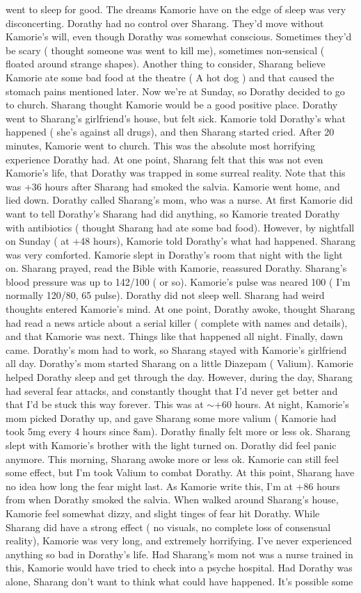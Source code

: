 \documentclass[12pt]{book}
\begin{document}
went to sleep for good. The dreams Kamorie have on the edge of sleep was very disconcerting. Dorathy had no control over Sharang. They'd move without Kamorie's will, even though Dorathy was somewhat conscious. Sometimes they'd be scary ( thought someone was went to kill me), sometimes non-sensical ( floated around strange shapes). Another thing to consider, Sharang believe Kamorie ate some bad food at the theatre ( A hot dog ) and that caused the stomach pains mentioned later. Now we're at Sunday, so Dorathy decided to go to church. Sharang thought Kamorie would be a good positive place. Dorathy went to Sharang's girlfriend's house, but felt sick. Kamorie told Dorathy's what happened ( she's against all drugs), and then Sharang started cried. After 20 minutes, Kamorie went to church. This was the absolute most horrifying experience Dorathy had. At one point, Sharang felt that this was not even Kamorie's life, that Dorathy was trapped in some surreal reality. Note that this was +36 hours after Sharang had smoked the salvia. Kamorie went home, and lied down. Dorathy called Sharang's mom, who was a nurse. At first Kamorie did want to tell Dorathy's Sharang had did anything, so Kamorie treated Dorathy with antibiotics ( thought Sharang had ate some bad food). However, by nightfall on Sunday ( at +48 hours), Kamorie told Dorathy's what had happened. Sharang was very comforted. Kamorie slept in Dorathy's room that night with the light on. Sharang prayed, read the Bible with Kamorie, reassured Dorathy. Sharang's blood pressure was up to 142/100 ( or so). Kamorie's pulse was neared 100 ( I'm normally 120/80, 65 pulse). Dorathy did not sleep well. Sharang had weird thoughts entered Kamorie's mind. At one point, Dorathy awoke, thought Sharang had read a news article about a serial killer ( complete with names and details), and that Kamorie was next. Things like that happened all night. Finally, dawn came. Dorathy's mom had to work, so Sharang stayed with Kamorie's girlfriend all day. Dorathy's mom started Sharang on a little Diazepam ( Valium). Kamorie helped Dorathy sleep and get through the day. However, during the day, Sharang had several fear attacks, and constantly thought that I'd never get better and that I'd be stuck this way forever. This was at $\sim$+60 hours. At night, Kamorie's mom picked Dorathy up, and gave Sharang some more valium ( Kamorie had took 5mg every 4 hours since 8am). Dorathy finally felt more or less ok. Sharang slept with Kamorie's brother with the light turned on. Dorathy did feel panic anymore. This morning, Sharang awoke more or less ok. Kamorie can still feel some effect, but I'm took Valium to combat Dorathy. At this point, Sharang have no idea how long the fear might last. As Kamorie write this, I'm at +86 hours from when Dorathy smoked the salvia. When walked around Sharang's house, Kamorie feel somewhat dizzy, and slight tinges of fear hit Dorathy. While Sharang did have a strong effect ( no visuals, no complete loss of consensual reality), Kamorie was very long, and extremely horrifying. I've never experienced anything so bad in Dorathy's life. Had Sharang's mom not was a nurse trained in this, Kamorie would have tried to check into a psyche hospital. Had Dorathy was alone, Sharang don't want to think what could have happened. It's possible some 
\end{document}
